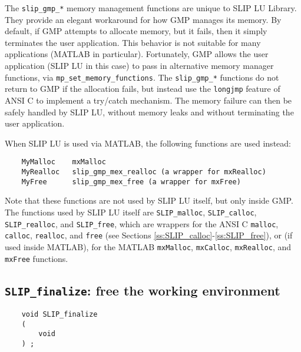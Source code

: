 \documentclass[12pt]{article}
\theoremstyle{definition}
\begin{document}
The \verb|slip_gmp_*| memory management functions are unique to SLIP LU
Library.  They provide an elegant workaround for how GMP manages its memory.
By default, if GMP attempts to allocate memory, but it fails, then it simply
terminates the user application.  This behavior is not suitable for many
applications (MATLAB in particular).  Fortunately, GMP allows the user
application (SLIP LU in this case) to pass in alternative memory manager
functions, via \verb|mp_set_memory_functions|.  The \verb|slip_gmp_*| functions
do not return to GMP if the allocation fails, but instead use the
\verb|longjmp| feature of ANSI C to implement a try/catch mechanism.  The
memory failure can then be safely handled by SLIP LU, without memory leaks and
without terminating the user application.

When SLIP LU is used via MATLAB, the following functions are used instead:

\begin{mdframed}[userdefinedwidth=6in]
{\footnotesize
\begin{verbatim}
    MyMalloc    mxMalloc
    MyRealloc   slip_gmp_mex_realloc (a wrapper for mxRealloc)
    MyFree      slip_gmp_mex_free (a wrapper for mxFree)
\end{verbatim}
} \end{mdframed}

Note that these functions are not used by SLIP LU itself, but only inside GMP.
The functions used by SLIP LU itself are \verb|SLIP_malloc|,
\verb|SLIP_calloc|, \verb|SLIP_realloc|, and \verb|SLIP_free|, which are
wrappers for the ANSI C \verb|malloc|, \verb|calloc|, \verb|realloc|, and
\verb|free| (see Sections \ref{ss:SLIP_calloc}-\ref{ss:SLIP_free}), or (if used
inside MATLAB), for the MATLAB \verb|mxMalloc|, \verb|mxCalloc|,
\verb|mxRealloc|, and \verb|mxFree| functions.

\cprotect\subsection{\verb|SLIP_finalize|: free the working environment}
\label{ss:SLIP_finalize}

\begin{mdframed}[userdefinedwidth=6in]
{\footnotesize
\begin{verbatim}
    void SLIP_finalize
    (
        void
    ) ;
\end{verbatim}
} \end{mdframed}
\end{document}
